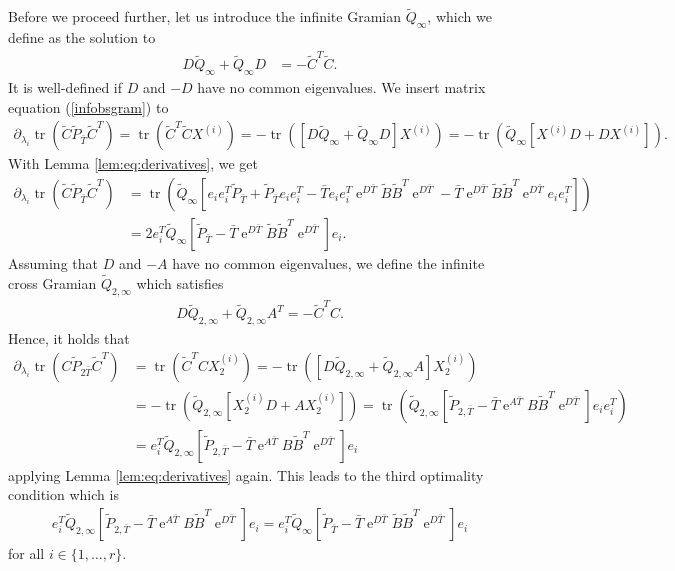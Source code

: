 \documentclass[a4paper,11pt, twoside]{article}
\newcommand{\expn}{\operatorname{e}}
\newcommand{\trace}{\operatorname{tr}}
\begin{document}
Before we proceed further, let us introduce the infinite Gramian $\tilde Q_{\infty}$, which we define as the solution to \begin{align}\label{infobsgram}  
D \tilde Q_{\infty}+\tilde Q_{\infty} D &=-\tilde C^T \tilde C.
                                          \end{align}    
It is well-defined if $D$ and $-D$ have no common eigenvalues. We insert matrix equation (\ref{infobsgram}) to
\begin{align*}
\partial_{\lambda_i}\trace(\tilde C \tilde P_{\bar T} \tilde C^T)=\trace(\tilde C^T\tilde C X^{(i)})=-\trace([D \tilde Q_{\infty}+\tilde Q_{\infty}D] 
X^{(i)})=-\trace(\tilde Q_{\infty}[X^{(i)} D +D X^{(i)}]).
\end{align*}
With Lemma \ref{lem:eq:derivatives}, we get \begin{align*}
\partial_{\lambda_i}\trace(\tilde C \tilde P_{\bar T} \tilde C^T)&= \trace(\tilde Q_{\infty}[e_ie_i^T\tilde P_{\bar T}+\tilde P_{\bar T}e_ie_i^T-\bar 
T e_ie_i^T\expn^{D \bar T}\tilde B \tilde B^T \expn^{D \bar T}-\bar T\expn^{D \bar T}\tilde B \tilde B^T \expn^{D \bar T}e_ie_i^T])\\&= 
2 e_i^T\tilde Q_{\infty}[\tilde P_{\bar T}-\bar T\expn^{D \bar T}\tilde B \tilde B^T \expn^{D \bar T}]e_i.
\end{align*}
Assuming that $D$ and $-A$ have no common eigenvalues, we define the infinite cross Gramian $\tilde Q_{2, \infty}$ which satisfies 
\begin{align*}
D \tilde Q_{2, {\infty}}+ \tilde Q_{2, {\infty}} A^T =-\tilde C^T C.
\end{align*}
Hence, it holds that \begin{align*}
\partial_{\lambda_i}\trace(C \tilde P_{2 \bar T} \tilde C^T)&=\trace(\tilde C^TC X_2^{(i)})=-\trace([D \tilde Q_{2, \infty}+\tilde Q_{2, \infty}A] 
X_2^{(i)})\\&=-\trace(\tilde Q_{2, \infty}[X_2^{(i)} D +A X_2^{(i)}])=\trace(\tilde Q_{2, \infty}[\tilde P_{2, {\bar T}}-\bar T \expn^{A 
\bar T}B \tilde B^T \expn^{D \bar T}]e_ie_i^T)\\&=e_i^T\tilde Q_{2, \infty}[\tilde P_{2, {\bar T}}-\bar T \expn^{A 
\bar T}B \tilde B^T \expn^{D \bar T}]e_i
\end{align*}
applying Lemma \ref{lem:eq:derivatives} again. This leads to the third optimality condition which is \begin{align}\label{opt3}
e_i^T\tilde Q_{2, \infty}[\tilde P_{2, {\bar T}}-\bar T \expn^{A 
\bar T}B \tilde B^T \expn^{D \bar T}]e_i=
 e_i^T\tilde Q_{\infty}[\tilde P_{\bar T}-\bar T\expn^{D \bar T}\tilde B \tilde B^T \expn^{D \bar T}]e_i
\end{align}
for all $i\in\{1, \ldots, r\}$.\smallskip
\end{document}
